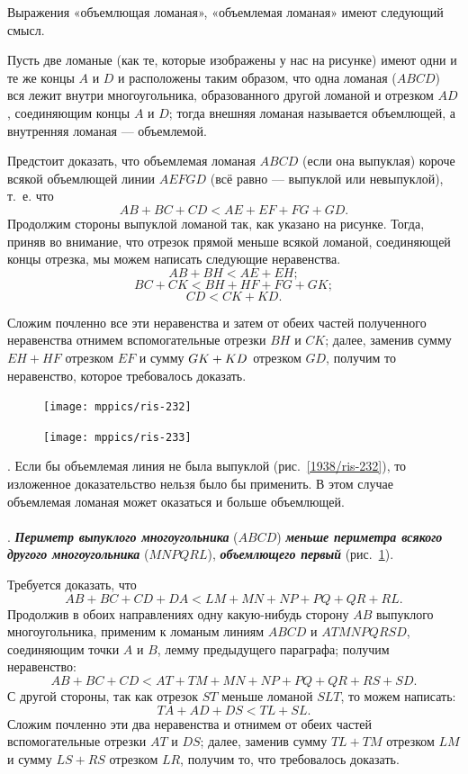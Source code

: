 \documentclass[oneside]{book}
\begin{document}
Выражения «объемлющая ломаная», «объемлемая ломаная» имеют следующий смысл.

Пусть две ломаные (как те, которые изображены у нас на рисунке) имеют одни и те же концы $A$ и $D$ и расположены таким образом, что одна ломаная ($ABCD$) вся лежит внутри многоугольника, образованного другой ломаной и отрезком $AD$, соединяющим концы $A$ и $D$;
тогда внешняя ломаная называется объемлющей, а внутренняя ломаная — объемлемой.

Предстоит доказать, что объемлемая ломаная $ABCD$ (если она выпуклая) короче всякой объемлющей линии $AEFGD$ (всё равно — выпуклой или невыпуклой), т.~е.
что
\[AB+BC+CD<AE+EF+FG+GD.\]
Продолжим стороны выпуклой ломаной так, как указано на рисунке.
Тогда, приняв во внимание, что отрезок прямой меньше всякой ломаной, соединяющей концы отрезка, мы можем написать следующие неравенства.
\[AB+BH<AE+EH;\]
\[BC+CK<BH+HF+FG+GK;\]
\[CD<CK+KD.\]

Сложим почленно все эти неравенства и затем от обеих частей полученного неравенства отнимем вспомогательные отрезки $BH$ и $CK$;
далее, заменив сумму $EH+HF$ отрезком $EF$ и сумму $GK\z+KD$ отрезком $GD$, получим то неравенство, которое требовалось доказать.

\begin{figure}[h!]
\begin{minipage}{.48\textwidth}
\centering
\texttt{[image: mppics/ris-232]}
\caption{}\label{1938/ris-232}
\end{minipage}\hfill
\begin{minipage}{.48\textwidth}
\centering
\texttt{[image: mppics/ris-233]}
\caption{}\label{1938/ris-233}
\end{minipage}
\end{figure}

\mbox{.}
Если бы объемлемая линия не была выпуклой (рис.~\ref{1938/ris-232}), то изложенное доказательство нельзя было бы применить.
В этом случае объемлемая ломаная может оказаться и больше объемлющей.

\paragraph{}\label{1938/233}
.
\textbf{\emph{Периметр выпуклого многоугольника}} ($ABCD$) \textbf{\emph{меньше периметра всякого другого многоугольника}} ($MNPQRL$), \textbf{\emph{объемлющего первый}} (рис.~\ref{1938/ris-233}).

Требуется доказать, что
\[AB+BC+CD+DA < LM+MN+NP+PQ+QR+RL.\]
Продолжив в обоих направлениях одну какую-нибудь сторону $AB$ выпуклого многоугольника, применим к ломаным линиям $ABCD$ и $ATMNPQRSD$, соединяющим точки $A$ и $B$, лемму предыдущего параграфа;
получим неравенство:
\[AB+BC+CD<AT+TM+MN+NP+PQ+QR+RS+SD.\]
С другой стороны, так как отрезок $ST$ меньше ломаной $SLT$, то можем написать:
\[TA+AD+DS<TL+SL.\]
Сложим почленно эти два неравенства и отнимем от обеих частей вспомогательные отрезки $AT$ и $DS$;
далее, заменив сумму $TL+TM$ отрезком $LM$ и сумму $LS+RS$ отрезком $LR$, получим то, что требовалось доказать.
\end{document}
